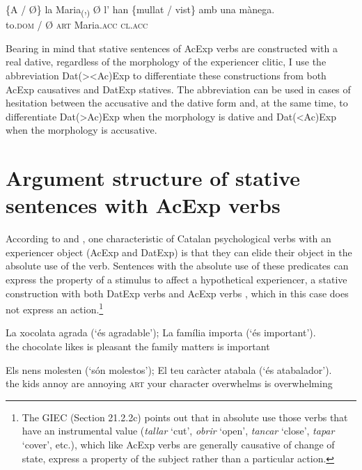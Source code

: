 \documentclass[output=paper,colorlinks,citecolor=brown,modfonts,nonflat]{langsci/langscibook}
\begin{document}
 \ex \label{ex:royo:17e}
 \gll \{A / Ø\} la Maria\textsubscript{(},\textsubscript{)} Ø l’ han \{mullat / vist\} amb una mànega.\\
 to.\textsc{dom} / Ø \textsc{art} Maria.\textsc{acc} \textsc{cl.acc} \\
\glt {}
 
 \z
 \z 

Bearing in mind that stative sentences of AcExp verbs are constructed with a real dative, regardless of the morphology of the experiencer clitic, I use the abbreviation Dat(>{\textbar}<Ac)Exp to differentiate these constructions from both AcExp causatives and DatExp statives. The abbreviation can be used in cases of hesitation between the accusative and the dative form and, at the same time, to differentiate Dat(>Ac)Exp when the morphology is dative and Dat(<Ac)Exp when the morphology is accusative.

\section{Argument structure of stative sentences with AcExp verbs}\label{sec:royo:5}

According to \citet[Sections 13.3.6.2a-b and 13.3.7.2b]{Rossello2008} and \citet[21.2.2b and 21.5a]{GIEC2016}, one characteristic of Catalan psychological verbs with an experiencer object (AcExp and DatExp) is that they can elide their object in the absolute use of the verb. Sentences with the absolute use of these predicates can express the property of a stimulus to affect a hypothetical experiencer, a stative construction with both DatExp verbs  and AcExp verbs , which in this case does not express an action.\footnote{The GIEC (Section 21.2.2c) points out that in absolute use those verbs that have an instrumental value (\textit{tallar} ‘cut’, \textit{obrir} ‘open’, \textit{tancar} ‘close’, \textit{tapar} ‘cover’, etc.), which like AcExp verbs are generally causative of change of state, express a property of the subject rather than a particular action.}

\ea%
 \label{ex:royo:18}
 \ea \label{ex:royo:18a}
 \gll La xocolata agrada (‘és agradable’); La família importa (‘és important’). \\
 the chocolate likes is pleasant the family matters is important\\
 \glt {}
 
 \ex \label{ex:royo:18b}
 \gll Els nens molesten (‘són molestos’); El teu caràcter atabala (‘és atabalador’).\\
  the kids annoy are annoying \textsc{art} your character overwhelms is overwhelming\\
 \glt  {}
 
\end{document}
